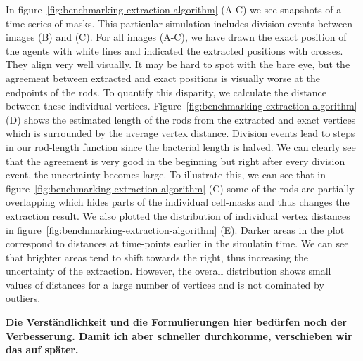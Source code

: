 \documentclass{article}
\begin{document}
In figure~\ref{fig:benchmarking-extraction-algorithm} (A-C) we see snapshots of a time series of
masks.
This particular simulation includes division events between images (B) and (C).
For all images (A-C), we have drawn the exact position of the agents with white lines and indicated
the extracted positions with crosses.
They align very well visually.
It may be hard to spot with the bare eye, but the agreement between extracted and exact positions is
visually worse at the endpoints of the rods.
To quantify this disparity, we calculate the distance between these individual vertices.
Figure~\ref{fig:benchmarking-extraction-algorithm} (D) shows the estimated length of the rods from
the extracted and exact vertices which is surrounded by the average vertex distance.
Division events lead to steps in our rod-length function since the bacterial length is halved.
We can clearly see that the agreement is very good in the beginning but right after every division
event, the uncertainty becomes large.
To illustrate this, we can see that in figure~\ref{fig:benchmarking-extraction-algorithm} (C) some
of the rods are partially overlapping which hides parts of the individual cell-masks and thus
changes the extraction result.
We also plotted the distribution of individual vertex distances in
figure~\ref{fig:benchmarking-extraction-algorithm} (E).
Darker areas in the plot correspond to distances at time-points earlier in the simulatin time.
We can see that brighter areas tend to shift towards the right, thus increasing the uncertainty of
the extraction.
However, the overall distribution shows small values of distances for a large number of vertices and
is not dominated by outliers.

\textbf{
    Die Verständlichkeit und die Formulierungen hier bedürfen noch der Verbesserung.
    Damit ich aber schneller durchkomme, verschieben wir das auf später.
}
\end{document}

